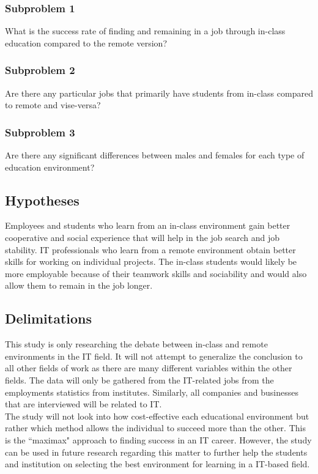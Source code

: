 \documentclass[titlepage]{article}
\begin{document}
\subsubsection{Subproblem 1}
What is the success rate of finding and remaining in a job through in-class
education compared to the remote version?

\subsubsection{Subproblem 2}
Are there any particular jobs that primarily have students from in-class compared to
remote and vise-versa?

\subsubsection{Subproblem 3}
Are there any significant differences between males and females for each type of
education environment?

\subsection{Hypotheses}

Employees and students who learn from an in-class environment gain better cooperative and
social experience that will help in the job search and job stability.  IT professionals who
learn from a remote environment obtain better skills for working on individual projects.  
The in-class students would likely be more employable because of their teamwork skills and
sociability and would also allow them to remain in the job longer.

\clearpage

\subsection{Delimitations}
This study is only researching the debate between in-class and remote environments in the
IT field.  It will not attempt to generalize the conclusion to all other fields of work
as there are many different variables within the other fields.  The data will only be gathered
from the IT-related jobs from the employments statistics from institutes.  Similarly, all
companies and businesses that are interviewed will be related to IT.\\

\noindent The study will not look into how cost-effective each educational environment but rather which
method allows the individual to succeed more than the other.  This is the ``maximax" approach
to finding success in an IT career. However, the study can be used in future research regarding 
this matter to further help the students and institution on selecting the best environment 
for learning in a IT-based field.
\end{document}
